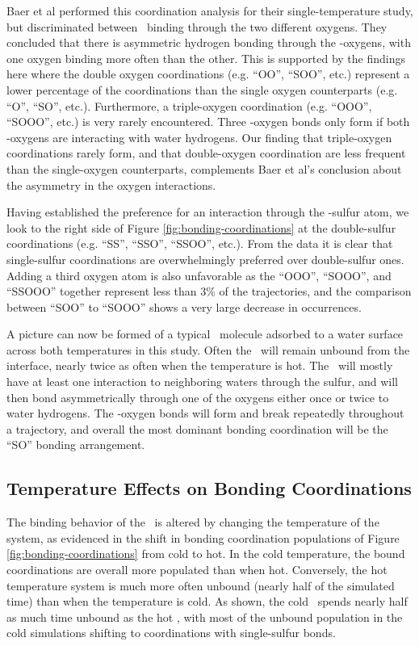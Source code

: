 \documentclass{article}
\begin{document}
Baer et al performed this coordination analysis for their single-temperature study, but discriminated between \suldiox~binding through the two different oxygens. They concluded that there is asymmetric hydrogen bonding through the \suldiox-oxygens, with one oxygen binding more often than the other. This is supported by the findings here where the double oxygen coordinations (e.g. ``OO'', ``SOO'', etc.) represent a lower percentage of the coordinations than the single oxygen counterparts (e.g. ``O'', ``SO'', etc.). Furthermore, a triple-oxygen coordination (e.g. ``OOO'', ``SOOO'', etc.) is very rarely encountered. Three \suldiox-oxygen bonds only form if both \suldiox-oxygens are interacting with water hydrogens. Our finding that triple-oxygen coordinations rarely form, and that double-oxygen coordination are less frequent than the single-oxygen counterparts, complements Baer et al's conclusion about the asymmetry in the oxygen interactions.

Having established the preference for an interaction through the \suldiox-sulfur atom, we look to the right side of Figure \ref{fig:bonding-coordinations} at the double-sulfur coordinations (e.g. ``SS'', ``SSO'', ``SSOO'', etc.). From the data it is clear that single-sulfur coordinations are overwhelmingly preferred over double-sulfur ones. Adding a third oxygen atom is also unfavorable as the ``OOO'', ``SOOO'', and ``SSOOO'' together represent less than 3\% of the trajectories, and the comparison between ``SOO'' to ``SOOO'' shows a very large decrease in occurrences.

A picture can now be formed of a typical \suldiox~molecule adsorbed to a water surface across both temperatures in this study. Often the \suldiox~will remain unbound from the interface, nearly twice as often when the temperature is hot. The \suldiox~will mostly have at least one interaction to neighboring waters through the sulfur, and will then bond asymmetrically through one of the oxygens either once or twice to water hydrogens. The \suldiox-oxygen bonds will form and break repeatedly throughout a trajectory, and overall the most dominant bonding coordination will be the ``SO'' bonding arrangement.

\subsection {Temperature Effects on Bonding Coordinations}

The binding behavior of the \suldiox~is altered by changing the temperature of the system, as evidenced in the shift in bonding coordination populations of Figure \ref{fig:bonding-coordinations} from cold to hot. In the cold temperature, the bound coordinations are overall more populated than when hot. Conversely, the hot temperature system is much more often unbound (nearly half of the simulated time) than when the temperature is cold. As shown, the cold \suldiox~spends nearly half as much time unbound as the hot \suldiox, with most of the unbound population in the cold simulations shifting to coordinations with single-sulfur bonds. 
\end{document}
